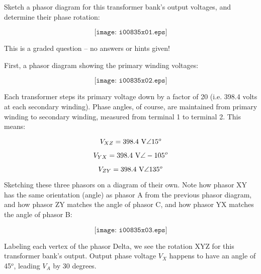 

Sketch a phasor diagram for this transformer bank's output voltages, and determine their phase rotation:

$$\texttt{[image: i00835x01.eps]}$$

\vfil 

\eject






This is a graded question -- no answers or hints given!







First, a phasor diagram showing the primary winding voltages:

$$\texttt{[image: i00835x02.eps]}$$

Each transformer steps its primary voltage down by a factor of 20 (i.e. 398.4 volts at each secondary winding).  Phase angles, of course, are maintained from primary winding to secondary winding, measured from terminal 1 to terminal 2.  This means:

$$V_{XZ} = 398.4 \hbox{ V} \angle 15^o$$  

$$V_{YX} = 398.4 \hbox{ V} \angle -105^o$$  

$$V_{ZY} = 398.4 \hbox{ V} \angle 135^o$$  

\vskip 10pt

Sketching these three phasors on a diagram of their own.  Note how phasor XY has the same orientation (angle) as phasor A from the previous phasor diagram, and how phasor ZY matches the angle of phasor C, and how phasor YX matches the angle of phasor B:

$$\texttt{[image: i00835x03.eps]}$$

Labeling each vertex of the phasor Delta, we see the rotation XYZ for this transformer bank's output.  Output phase voltage $V_X$ happens to have an angle of 45$^{o}$, leading $V_A$ by 30 degrees.




